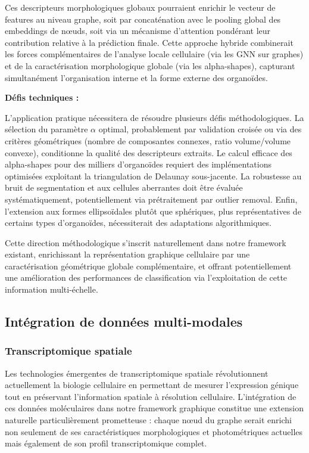 Ces descripteurs morphologiques globaux pourraient enrichir le vecteur de features au niveau graphe, soit par concaténation avec le pooling global des embeddings de nœuds, soit via un mécanisme d'attention pondérant leur contribution relative à la prédiction finale. Cette approche hybride combinerait les forces complémentaires de l'analyse locale cellulaire (via les GNN sur graphes) et de la caractérisation morphologique globale (via les alpha-shapes), capturant simultanément l'organisation interne et la forme externe des organoïdes.

\textbf{Défis techniques :}

L'application pratique nécessitera de résoudre plusieurs défis méthodologiques. La sélection du paramètre $\alpha$ optimal, probablement par validation croisée ou via des critères géométriques (nombre de composantes connexes, ratio volume/volume convexe), conditionne la qualité des descripteurs extraits. Le calcul efficace des alpha-shapes pour des milliers d'organoïdes requiert des implémentations optimisées exploitant la triangulation de Delaunay sous-jacente. La robustesse au bruit de segmentation et aux cellules aberrantes doit être évaluée systématiquement, potentiellement via prétraitement par outlier removal. Enfin, l'extension aux formes ellipsoïdales plutôt que sphériques, plus représentatives de certains types d'organoïdes, nécessiterait des adaptations algorithmiques.

Cette direction méthodologique s'inscrit naturellement dans notre framework existant, enrichissant la représentation graphique cellulaire par une caractérisation géométrique globale complémentaire, et offrant potentiellement une amélioration des performances de classification via l'exploitation de cette information multi-échelle.

\subsection{Intégration de données multi-modales}

\subsubsection{Transcriptomique spatiale}

Les technologies émergentes de transcriptomique spatiale révolutionnent actuellement la biologie cellulaire en permettant de mesurer l'expression génique tout en préservant l'information spatiale à résolution cellulaire. L'intégration de ces données moléculaires dans notre framework graphique constitue une extension naturelle particulièrement prometteuse : chaque nœud du graphe serait enrichi non seulement de ses caractéristiques morphologiques et photométriques actuelles mais également de son profil transcriptomique complet.

